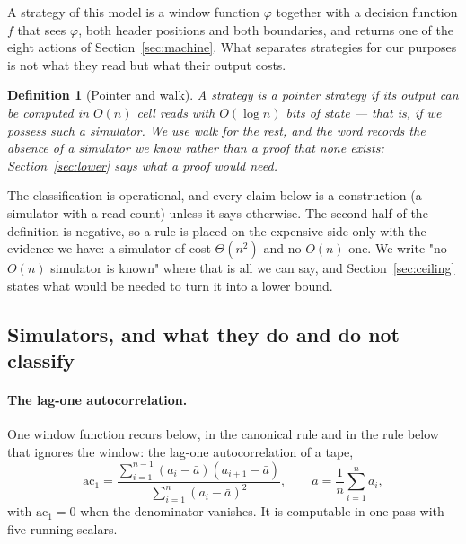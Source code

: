 \documentclass[11pt]{article}
\newtheorem{definition}{Definition}
\begin{document}
A strategy of this model is a window function $\varphi$ together with a decision function $f$ that
sees $\varphi$, both header positions and both boundaries, and returns one of the eight
actions of Section~\ref{sec:machine}. What separates strategies for our purposes is not
what they read but what their output costs.

\begin{definition}[Pointer and walk]
A strategy is a \emph{pointer} strategy if its output can be computed in $O(n)$ cell reads with
$O(\log n)$ bits of state --- that is, if we possess such a simulator. We use \emph{walk} for the
rest, and the word records the absence of a simulator we know rather than a proof that none exists:
Section~\ref{sec:lower} says what a proof would need.
\end{definition}

The classification is operational, and every claim below is a construction (a simulator with a read
count) unless it says otherwise. The second half of the definition is negative, so a rule is placed
on the expensive side only with the evidence we have: a simulator of cost $\Theta(n^2)$ and no
$O(n)$ one. We write "no $O(n)$ simulator is known" where that is all we can say, and
Section~\ref{sec:ceiling} states what would be needed to turn it into a lower bound.

\subsection{Simulators, and what they do and do not classify}
\label{sec:sims}

\paragraph{The lag-one autocorrelation.} One window function recurs below, in the canonical rule
and in the rule below that ignores the window: the lag-one autocorrelation of
a tape,
\[
\mathrm{ac}_1=\frac{\sum_{i=1}^{n-1}(a_i-\bar a)(a_{i+1}-\bar a)}{\sum_{i=1}^{n}(a_i-\bar a)^2},
\qquad \bar a=\frac1n\sum_{i=1}^{n}a_i,
\]
with $\mathrm{ac}_1=0$ when the denominator vanishes. It is computable in one pass with five running
scalars.
\end{document}
